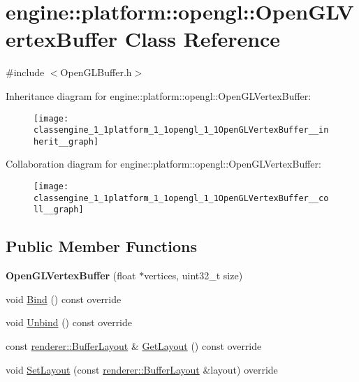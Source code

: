 \hypertarget{classengine_1_1platform_1_1opengl_1_1OpenGLVertexBuffer}{}\section{engine\+:\+:platform\+:\+:opengl\+:\+:Open\+G\+L\+Vertex\+Buffer Class Reference}
\label{classengine_1_1platform_1_1opengl_1_1OpenGLVertexBuffer}


{\ttfamily \#include $<$Open\+G\+L\+Buffer.\+h$>$}



Inheritance diagram for engine\+:\+:platform\+:\+:opengl\+:\+:Open\+G\+L\+Vertex\+Buffer\+:
\nopagebreak
\begin{figure}[H]
\begin{center}
\leavevmode
\texttt{[image: classengine\_1\_1platform\_1\_1opengl\_1\_1OpenGLVertexBuffer\_\_inherit\_\_graph]}
\end{center}
\end{figure}


Collaboration diagram for engine\+:\+:platform\+:\+:opengl\+:\+:Open\+G\+L\+Vertex\+Buffer\+:
\nopagebreak
\begin{figure}[H]
\begin{center}
\leavevmode
\texttt{[image: classengine\_1\_1platform\_1\_1opengl\_1\_1OpenGLVertexBuffer\_\_coll\_\_graph]}
\end{center}
\end{figure}
\subsection*{Public Member Functions}
\begin{DoxyCompactItemize}
\item 
\mbox{\label{classengine_1_1platform_1_1opengl_1_1OpenGLVertexBuffer_a481164805afb44795f3e545e07c3b3bc}} 
{\bfseries Open\+G\+L\+Vertex\+Buffer} (float $\ast$vertices, uint32\+\_\+t size)
\item 
void \hyperlink{classengine_1_1platform_1_1opengl_1_1OpenGLVertexBuffer_ac50918719a747f81d7fe94dfcc8dec13}{Bind} () const override
\item 
void \hyperlink{classengine_1_1platform_1_1opengl_1_1OpenGLVertexBuffer_a9069ca746c0de9dd9418ba9c5ee7b67b}{Unbind} () const override
\item 
const \hyperlink{classengine_1_1renderer_1_1BufferLayout}{renderer\+::\+Buffer\+Layout} \& \hyperlink{classengine_1_1platform_1_1opengl_1_1OpenGLVertexBuffer_a0d4f81503171f6bbe41ece0fada23390}{Get\+Layout} () const override
\item 
void \hyperlink{classengine_1_1platform_1_1opengl_1_1OpenGLVertexBuffer_a957a9dc55dc35ce4302654e1a394e5f8}{Set\+Layout} (const \hyperlink{classengine_1_1renderer_1_1BufferLayout}{renderer\+::\+Buffer\+Layout} \&layout) override
\end{DoxyCompactItemize}

